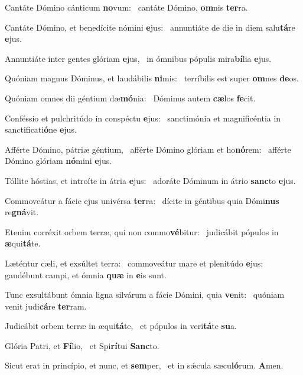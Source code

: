 \item Cantáte Dómino cánticum \textbf{no}vum:~\psstar{} cantáte Dómino, \textbf{om}nis \textbf{ter}ra.
\item Cantáte Dómino, et benedícite nómini \textbf{e}jus:~\psstar{} annuntiáte de die in diem salu\textbf{tá}re \textbf{e}jus.
\item Annuntiáte inter gentes glóriam \textbf{e}jus,~\psstar{} in ómnibus pópulis mira\textbf{bí}lia \textbf{e}jus.
\item Quóniam magnus Dóminus, et laudábilis \textbf{ni}mis:~\psstar{} terríbilis est super \textbf{om}nes \textbf{de}os.
\item Quóniam omnes dii géntium dæ\textbf{mó}nia:~\psstar{} Dóminus autem \textbf{cæ}los \textbf{fe}cit.
\item Conféssio et pulchritúdo in conspéctu \textbf{e}jus:~\psstar{} sanctimónia et magnificéntia in sanctificati\textbf{ó}ne \textbf{e}jus.
\item Afférte Dómino, pátriæ géntium,~\pscross{} afférte Dómino glóriam et ho\textbf{nó}rem:~\psstar{} afférte Dómino glóriam \textbf{nó}mini \textbf{e}jus.
\item Tóllite hóstias, et introíte in átria \textbf{e}jus:~\psstar{} adoráte Dóminum in átrio \textbf{sanc}to \textbf{e}jus.
\item Commoveátur a fácie ejus univérsa \textbf{ter}ra:~\psstar{} dícite in géntibus quia Dómi\textbf{nus} re\textbf{gná}vit.
\item Etenim corréxit orbem terræ, qui non commo\textbf{vé}bitur:~\psstar{} judicábit pópulos in \textbf{æ}qui\textbf{tá}te.
\item Læténtur cæli, et exsúltet terra:~\pscross{} commoveátur mare et plenitúdo \textbf{e}jus:~\psstar{} gaudébunt campi, et ómnia \textbf{quæ} in \textbf{e}is sunt.
\item Tunc exsultábunt ómnia ligna silvárum a fácie Dómini, quia \textbf{ve}nit:~\psstar{} quóniam venit judi\textbf{cá}re \textbf{ter}ram.
\item Judicábit orbem terræ in æqui\textbf{tá}te,~\psstar{} et pópulos in veri\textbf{tá}te \textbf{su}a.
\item Glória Patri, et \textbf{Fí}lio,~\psstar{} et Spi\textbf{rí}tui \textbf{Sanc}to.
\item Sicut erat in princípio, et nunc, et \textbf{sem}per,~\psstar{} et in sǽcula sæcu\textbf{ló}rum. \textbf{A}men.
